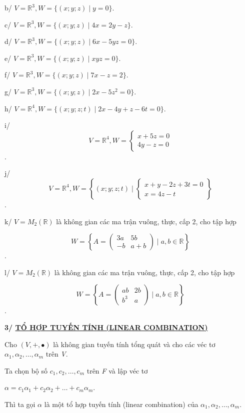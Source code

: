 \documentclass[12pt,a4paper]{article}
\begin{document}
b/ $V = \mathbb{R}^3, W = \{(x; y; z) \mid y = 0\}$.

c/ $V = \mathbb{R}^3, W = \{(x; y; z) \mid 4x = 2y - z\}$.

d/ $V = \mathbb{R}^3, W = \{(x; y; z) \mid 6x - 5yz = 0\}$.

e/ $V = \mathbb{R}^3, W = \{(x; y; z) \mid xyz = 0\}$.

f/ $V = \mathbb{R}^3, W = \{(x; y; z) \mid 7x - z = 2\}$.

g/ $V = \mathbb{R}^3, W = \{(x; y; z) \mid 2x - 5z^2 = 0\}$.

h/ $V = \mathbb{R}^4, W = \{(x; y; z; t) \mid 2x - 4y + z - 6t = 0\}$.

i/ \[ V = \mathbb{R}^4, W = \begin{cases} x + 5z = 0 \\ 4y - z = 0 \end{cases} \].

j/ \[ V = \mathbb{R}^4, W = \left\{ (x;y;z;t) \mid \begin{cases} x + y - 2z + 3t = 0 \\ x = 4z - t \end{cases} \right\} \].

k/ $V = M_2(\mathbb{R})$ là không
gian các ma trận vuông, thực, cấp 2, cho tập hợp

\[ W = \left\{ A = \begin{pmatrix} 3a & 5b \\ -b & a+b \end{pmatrix} \mid a,b \in \mathbb{R} \right\} \].

l/ $V = M_2(\mathbb{R})$ là không
gian các ma trận vuông, thực, cấp 2, cho tập hợp

\[ W = \left\{ A = \begin{pmatrix} ab & 2b \\ b^3 & a \end{pmatrix} \mid a,b \in \mathbb{R} \right\} \].

\textbf{3/ \ul{TỔ HỢP TUYẾN TÍNH (LINEAR COMBINATION)}}

Cho $(V, +, \bullet)$ là không
gian tuyến tính tổng quát và cho các véc tơ
$\alpha_1, \alpha_2, \dots, \alpha_m$ trên \emph{V}.

Ta chọn bộ số $c_1, c_2, \dots, c_m$
trên \emph{F} và lập véc tơ

$\alpha = c_1\alpha_1 + c_2\alpha_2 + \dots + c_m\alpha_m$.

Thì ta gọi $\alpha$ là
một tổ hợp tuyến tính (linear combination) của
$\alpha_1, \alpha_2, \dots, \alpha_m$.
\end{document}
